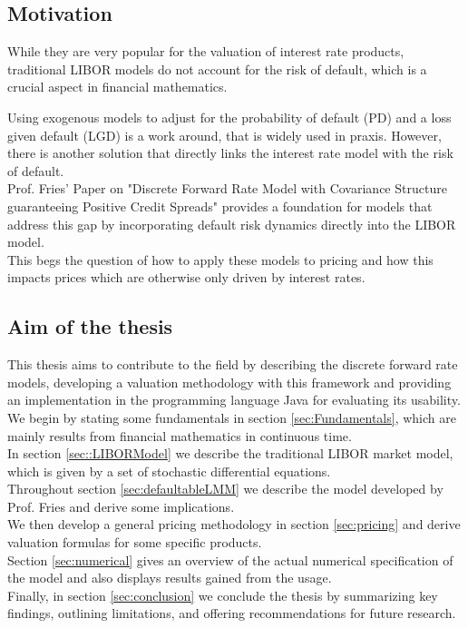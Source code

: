 \documentclass[12pt]{article}
\begin{document}
	
	\subsection{Motivation}
	While they are very popular for the valuation of interest rate products, traditional LIBOR models do not account for the risk of default, which is a crucial aspect in financial mathematics. 
	
	Using exogenous models to adjust for the probability of default (PD) and a loss given default (LGD) is a work around, that is widely used in praxis. However, there is another solution that directly links the interest rate model with the risk of default.\\
	Prof. Fries' Paper on "Discrete Forward Rate Model with	Covariance Structure guaranteeing Positive Credit Spreads" \cite{friesDLMM} provides a foundation for models that address this gap by incorporating default risk dynamics directly into the LIBOR model.\\
	This begs the question of how to apply these models to pricing and how this impacts prices which are otherwise only driven by interest rates.
	
	\subsection{Aim of the thesis}
	
	This thesis aims to contribute to the field by describing the discrete forward rate models, developing a valuation methodology with this framework and providing an implementation in the programming language Java for evaluating its usability.\\
	
	We begin by stating some fundamentals in section \ref{sec:Fundamentals}, which are mainly results from financial mathematics in continuous time.\\
	In section \ref{sec::LIBORModel} we describe the traditional LIBOR market model, which is given by a set of stochastic differential equations.\\
	Throughout section \ref{sec:defaultableLMM} we describe the model developed by Prof. Fries and derive some implications.\\
	We then develop a general pricing methodology in section \ref{sec:pricing} and derive valuation formulas for some specific products.\\
	Section \ref{sec:numerical} gives an overview of the actual numerical specification of the model and also displays results gained from the usage.\\
	Finally, in section \ref{sec:conclusion} we conclude the thesis by summarizing key findings, outlining limitations, and offering recommendations for future research.
	
\end{document}

